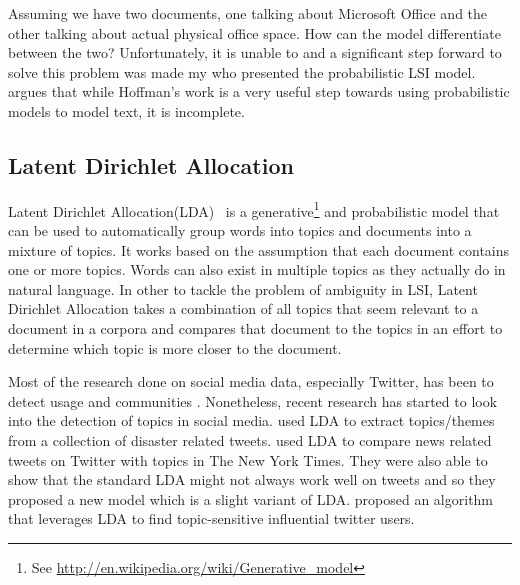 Assuming we have two documents, one talking about Microsoft Office and the other talking about
actual physical office space. How can the model differentiate between the two? Unfortunately, it is
unable to and a significant step forward to solve this problem was made my
\cite{hofmann1999probabilistic} who presented the probabilistic LSI model. \cite{blei2003latent}
argues that while Hoffman's work is a very useful step towards using probabilistic models to model
text, it is incomplete.

\subsection{Latent Dirichlet Allocation}
\label{sub:bg_lda}
Latent Dirichlet Allocation(LDA)~\cite{blei2003latent} is a generative\footnote{See
\url{http://en.wikipedia.org/wiki/Generative_model}} and probabilistic model that can be used to
automatically group words into topics and documents into a mixture of topics. It works based on the
assumption that each document contains one or more topics. Words can also exist in multiple topics
as they actually do in natural language. In other to tackle the problem of ambiguity in LSI, Latent
Dirichlet Allocation takes a combination of all topics that seem relevant to a document in a corpora
and compares that document to the topics in an effort to determine which topic is more closer to the
document.

Most of the research done on social media data, especially Twitter, has been to detect usage and
communities \cite{java2007we}. Nonetheless, recent research has started to look into the detection
of topics in social media. \cite{kireyev2009applications} used LDA to extract topics/themes from a
collection of disaster related tweets. \cite{zhao2011comparing} used LDA to compare news related
tweets on Twitter with topics in The New York Times. They were also able to show that the standard
LDA might not always work well on tweets and so they proposed a new model which is a slight variant
of LDA. \cite{weng2010twitterrank} proposed an algorithm that leverages LDA to find topic-sensitive
influential twitter users.

